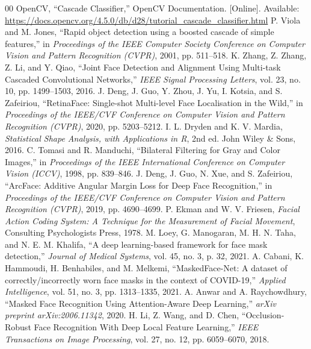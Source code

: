 \documentclass{article} %
\begin{document}
% 
% 
\begin{thebibliography}{00}
 OpenCV, ``Cascade Classifier,'' OpenCV Documentation. [Online]. Available: \url{https://docs.opencv.org/4.5.0/db/d28/tutorial_cascade_classifier.html}
 P. Viola and M. Jones, ``Rapid object detection using a boosted cascade of simple features,'' in \textit{Proceedings of the IEEE Computer Society Conference on Computer Vision and Pattern Recognition (CVPR)}, 2001, pp. 511--518.
 K. Zhang, Z. Zhang, Z. Li, and Y. Qiao, ``Joint Face Detection and Alignment Using Multi-task Cascaded Convolutional Networks,'' \textit{IEEE Signal Processing Letters}, vol. 23, no. 10, pp. 1499--1503, 2016.
 J. Deng, J. Guo, Y. Zhou, J. Yu, I. Kotsia, and S. Zafeiriou, ``RetinaFace: Single-shot Multi-level Face Localisation in the Wild,'' in \textit{Proceedings of the IEEE/CVF Conference on Computer Vision and Pattern Recognition (CVPR)}, 2020, pp. 5203--5212.
 I. L. Dryden and K. V. Mardia, \textit{Statistical Shape Analysis, with Applications in R}, 2nd ed. John Wiley \& Sons, 2016.
 C. Tomasi and R. Manduchi, ``Bilateral Filtering for Gray and Color Images,'' in \textit{Proceedings of the IEEE International Conference on Computer Vision (ICCV)}, 1998, pp. 839--846.
 J. Deng, J. Guo, N. Xue, and S. Zafeiriou, ``ArcFace: Additive Angular Margin Loss for Deep Face Recognition,'' in \textit{Proceedings of the IEEE/CVF Conference on Computer Vision and Pattern Recognition (CVPR)}, 2019, pp. 4690--4699.
 P. Ekman and W. V. Friesen, \textit{Facial Action Coding System: A Technique for the Measurement of Facial Movement}, Consulting Psychologists Press, 1978.
 M. Loey, G. Manogaran, M. H. N. Taha, and N. E. M. Khalifa, ``A deep learning-based framework for face mask detection,'' \textit{Journal of Medical Systems}, vol. 45, no. 3, p. 32, 2021.
 A. Cabani, K. Hammoudi, H. Benhabiles, and M. Melkemi, ``MaskedFace-Net: A dataset of correctly/incorrectly worn face masks in the context of COVID-19,'' \textit{Applied Intelligence}, vol. 51, no. 3, pp. 1313--1335, 2021.
 A. Anwar and A. Raychowdhury, ``Masked Face Recognition Using Attention-Aware Deep Learning,'' \textit{arXiv preprint arXiv:2006.11342}, 2020.
 H. Li, Z. Wang, and D. Chen, ``Occlusion-Robust Face Recognition With Deep Local Feature Learning,'' \textit{IEEE Transactions on Image Processing}, vol. 27, no. 12, pp. 6059--6070, 2018.

\end{thebibliography}
\end{document}
